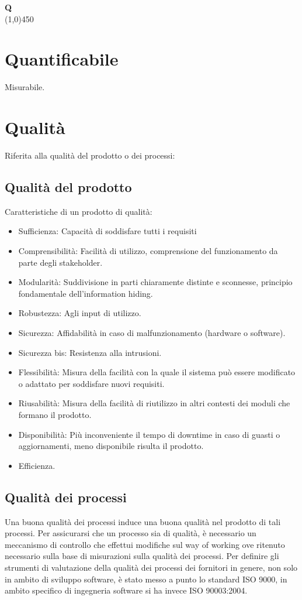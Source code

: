 \documentclass[11pt]{article}
\begin{document}
	{\Huge{\textbf{Q}}} \\
	\line(1,0){450}
	
	\section{\LARGE Quantificabile}
	\label{sec:quantificabile}
	Misurabile.
	
	\section{\LARGE Qualità} 
	\label{sec:qualita}
	Riferita alla qualità del prodotto o dei processi:
	\subsection{Qualità del prodotto}
	Caratteristiche di un prodotto di qualità:
	\begin{itemize}  
	\item Sufficienza: Capacità di soddisfare tutti i requisiti
	\item Comprensibilità: Facilità di utilizzo, comprensione del funzionamento da parte degli stakeholder.
	\item Modularità: Suddivisione in parti chiaramente distinte e sconnesse, principio fondamentale dell'information hiding. 
	\item Robustezza: Agli input di utilizzo.
	\item Sicurezza: Affidabilità in caso di malfunzionamento (hardware o software).
	\item Sicurezza bis: Resistenza alla intrusioni. 
	\item Flessibilità: Misura della facilità con la quale il sistema può essere modificato o adattato per soddisfare nuovi requisiti.
	\item Riusabilità: Misura della facilità di riutilizzo in altri contesti dei moduli che formano il prodotto.
	\item Disponibilità: Più inconveniente il tempo di downtime in caso di guasti o aggiornamenti, meno disponibile risulta il prodotto.	
	\item Efficienza.
	\end{itemize}
	\subsection{Qualità dei processi}
	Una buona qualità dei processi induce una buona qualità nel prodotto di tali processi. Per assicurarsi che un processo sia di qualità, è necessario un meccanismo di controllo che effettui modifiche sul way of working ove ritenuto necessario sulla base di misurazioni sulla qualità dei processi. Per definire gli strumenti di valutazione della qualità dei processi dei fornitori in genere, non solo in ambito di sviluppo software, è stato messo a punto lo standard ISO 9000, in ambito specifico di ingegneria software si ha invece ISO 90003:2004.
	
\end{document}
